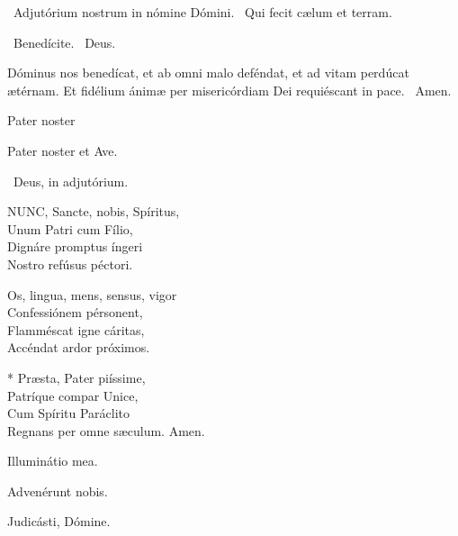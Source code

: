 \V\ Adjutórium nostrum in nómine Dómini. \R\ Qui fecit cælum et terram.

\V\ Benedícite. \R\ Deus.

 Dóminus nos benedícat, et ab omni malo deféndat, et ad vitam perdúcat ætérnam. Et fidélium ánimæ per misericórdiam Dei requiéscant in pace. \R\ Amen.

 Pater noster 

\sectionornament




Pater noster et Ave.

\V\ Deus, in adjutórium.


\lettrine[lines=2]{N}{UNC}, Sancte, nobis, Spíritus,\\
Unum Patri cum Fílio,\\
Dignáre promptus íngeri\\
Nostro refúsus péctori.

Os, lingua, mens, sensus, vigor\\
Confessiónem pérsonent,\\
Flamméscat igne cáritas,\\
Accéndat ardor próximos.

* Præsta, Pater piíssime,\\
Patríque compar Unice,\\
Cum Spíritu Paráclito\\
Regnans per omne sæculum. Amen.

  Illuminátio mea.



 Advenérunt nobis.


 Judicásti, Dómine.

